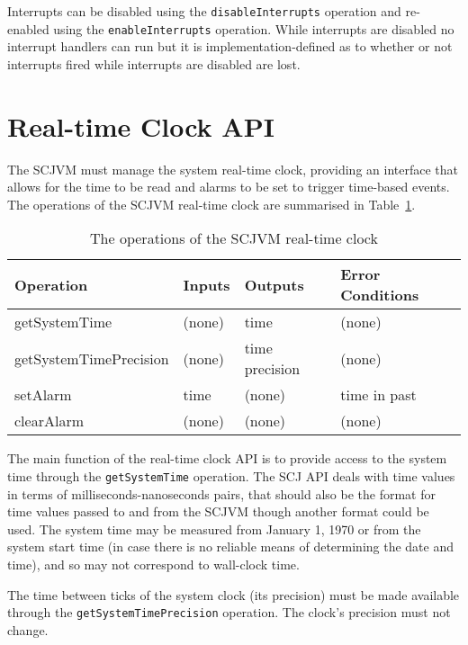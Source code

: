 \documentclass[a4paper,10pt]{report}
\begin{document}
Interrupts can be disabled using the \texttt{disable\-Interrupts} operation and
re-enabled using the \texttt{enable\-Interrupts} operation. While interrupts are
disabled no interrupt handlers can run but it is implementation-defined as to
whether or not interrupts fired while interrupts are disabled are lost.

\section{Real-time Clock API}
\label{realtime-clock-sec}

The SCJVM must manage the system real-time clock, providing an interface that
allows for the time to be read and alarms to be set to trigger time-based
events. The operations of the SCJVM real-time clock are summarised in
Table~\ref{realtime-clock-table}.

\begin{table}[ht]
  \centering
  \footnotesize
  \begin{tabular}{|l|p{0.9cm}|p{1.8cm}|p{2.3cm}|}
    Operation & Inputs & Outputs & Error Conditions \\
    \hline
    getSystemTime &
      (none) &
      time &
      (none)
    \\getSystemTimePrecision &
      (none) &
      time precision &
      (none)
    \\setAlarm &
      time &
      (none) &
      time in past
    \\clearAlarm &
      (none) &
      (none) &
      (none)
  \end{tabular}
  \caption{The operations of the SCJVM real-time clock}
  \label{realtime-clock-table}
\end{table}

The main function of the real-time clock API is to provide access to the system
time through the \texttt{get\-System\-Time} operation. The SCJ API deals with
time values in terms of milliseconds-nanoseconds pairs, that should also be the
format for time values passed to and from the SCJVM though another format could
be used. The system time may be measured from January 1, 1970 or from the system
start time (in case there is no reliable means of determining the date
and time), and so may not correspond to wall-clock time.

The time between ticks of the system clock (its precision) must be made
available through the \texttt{get\-System\-Time\-Precision} operation. The
clock's precision must not change.
\end{document}

